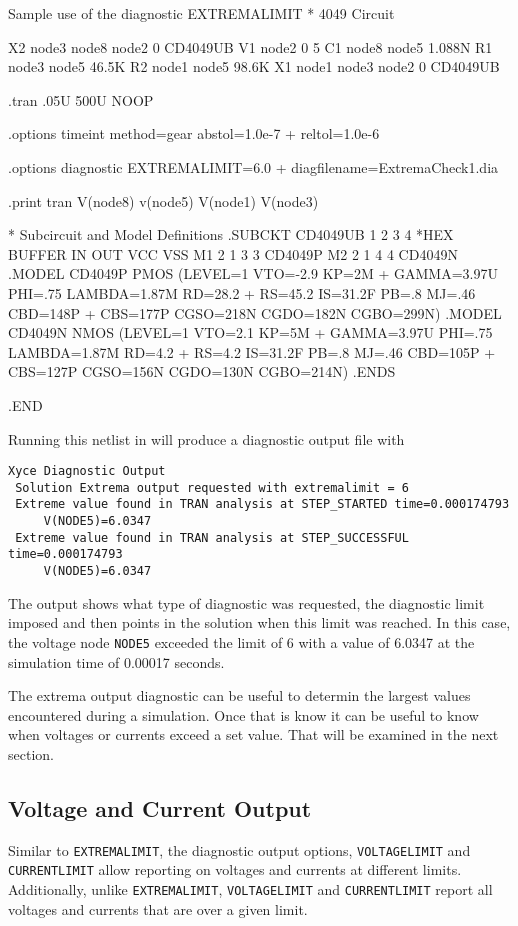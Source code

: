 \begin{NetlistFigure}{Sample use of the diagnostic EXTREMALIMIT}
* 4049 Circuit

X2 node3 node8 node2 0 CD4049UB
V1 node2 0 5
C1 node8 node5 1.088N
R1 node3 node5 46.5K
R2 node1 node5 98.6K
X1 node1 node3 node2 0 CD4049UB

.tran .05U 500U NOOP

.options timeint method=gear abstol=1.0e-7 
+ reltol=1.0e-6

.options diagnostic EXTREMALIMIT=6.0 
+ diagfilename=ExtremaCheck1.dia

.print tran V(node8) v(node5) V(node1) V(node3)

* Subcircuit and Model Definitions
.SUBCKT CD4049UB 1  2   3   4
*HEX BUFFER    IN OUT VCC VSS
M1 2 1 3 3 CD4049P
M2 2 1 4 4 CD4049N
.MODEL CD4049P PMOS (LEVEL=1 VTO=-2.9 KP=2M 
+ GAMMA=3.97U PHI=.75 LAMBDA=1.87M RD=28.2 
+ RS=45.2 IS=31.2F PB=.8 MJ=.46 CBD=148P 
+ CBS=177P CGSO=218N CGDO=182N CGBO=299N)
.MODEL CD4049N NMOS (LEVEL=1 VTO=2.1 KP=5M 
+ GAMMA=3.97U PHI=.75 LAMBDA=1.87M RD=4.2 
+ RS=4.2 IS=31.2F PB=.8 MJ=.46 CBD=105P 
+ CBS=127P CGSO=156N CGDO=130N CGBO=214N)
.ENDS

.END
\end{NetlistFigure}

Running this netlist in \Xyce{} will produce a diagnostic output file with 
\begin{verbatim}
Xyce Diagnostic Output
 Solution Extrema output requested with extremalimit = 6
 Extreme value found in TRAN analysis at STEP_STARTED time=0.000174793
     V(NODE5)=6.0347
 Extreme value found in TRAN analysis at STEP_SUCCESSFUL time=0.000174793
     V(NODE5)=6.0347
\end{verbatim}

The output shows what type of diagnostic was requested, the diagnostic limit imposed
and then points in the solution when this limit was reached.  In this case, the 
voltage node \texttt{NODE5} exceeded the limit of 6 with a value of 6.0347 at the 
simulation time of 0.00017 seconds.

The extrema output diagnostic can be useful to determin the largest values encountered
during a simulation.  Once that is know it can be useful to know when voltages or 
currents exceed a set value.  That will be examined in the next section.

\subsection{Voltage and Current Output}
Similar to \texttt{EXTREMALIMIT}, the diagnostic output options, \texttt{VOLTAGELIMIT} and
\texttt{CURRENTLIMIT} allow reporting on voltages and currents at different limits.  Additionally,
unlike \texttt{EXTREMALIMIT}, \texttt{VOLTAGELIMIT} and \texttt{CURRENTLIMIT} report all 
voltages and currents that are over a given limit.  

